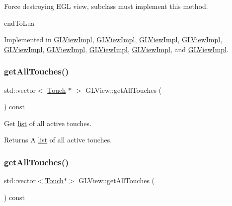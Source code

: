 Force destroying E\+GL view, subclass must implement this method.

end\+To\+Lua 

Implemented in \hyperlink{classGLViewImpl_a045b39ae9907d0c2d25d49a70e5ce9e4}{G\+L\+View\+Impl}, \hyperlink{classGLViewImpl_ab5a08a3ea92598cdabbed94686eed58a}{G\+L\+View\+Impl}, \hyperlink{classGLViewImpl_ab5a08a3ea92598cdabbed94686eed58a}{G\+L\+View\+Impl}, \hyperlink{classGLViewImpl_ab5a08a3ea92598cdabbed94686eed58a}{G\+L\+View\+Impl}, \hyperlink{classGLViewImpl_ab5a08a3ea92598cdabbed94686eed58a}{G\+L\+View\+Impl}, \hyperlink{classGLViewImpl_a045b39ae9907d0c2d25d49a70e5ce9e4}{G\+L\+View\+Impl}, \hyperlink{classGLViewImpl_ab2d87c9a94b84691ed9ae4ca378745a8}{G\+L\+View\+Impl}, \hyperlink{classGLViewImpl_ab2d87c9a94b84691ed9ae4ca378745a8}{G\+L\+View\+Impl}, and \hyperlink{classGLViewImpl_ab2d87c9a94b84691ed9ae4ca378745a8}{G\+L\+View\+Impl}.

\mbox{\label{classGLView_ac66a21bfd3605354ebc3aecd6cfd85ed}} 
\subsubsection{\texorpdfstring{get\+All\+Touches()}{getAllTouches()}\hspace{0.1cm}{\footnotesize\ttfamily [1/2]}}
{\footnotesize\ttfamily std\+::vector$<$ \hyperlink{classTouch}{Touch} $\ast$ $>$ G\+L\+View\+::get\+All\+Touches (\begin{DoxyParamCaption}{ }\end{DoxyParamCaption}) const}

Get \hyperlink{protocollist-p}{list} of all active touches.

\begin{DoxyReturn}{Returns}
A \hyperlink{protocollist-p}{list} of all active touches. 
\end{DoxyReturn}
\mbox{\label{classGLView_af967a29c1bde166b9f48b1d8d1174d91}} 
\subsubsection{\texorpdfstring{get\+All\+Touches()}{getAllTouches()}\hspace{0.1cm}{\footnotesize\ttfamily [2/2]}}
{\footnotesize\ttfamily std\+::vector$<$\hyperlink{classTouch}{Touch}$\ast$$>$ G\+L\+View\+::get\+All\+Touches (\begin{DoxyParamCaption}{ }\end{DoxyParamCaption}) const}

